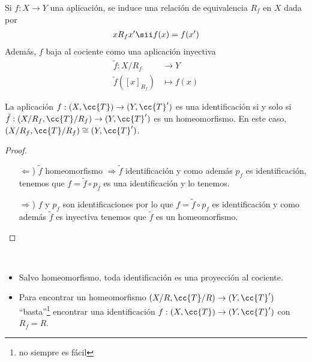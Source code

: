 \begin{definicion}
    Si $f:X\to Y$ una aplicación, se induce una relación de equivalencia $R_f$ en $X$ dada por 
    \begin{align*}
        xR_fx' \sii f(x)=f(x')
    \end{align*}
    Además, $f$ baja al cociente como una aplicación inyectiva
    \begin{align*}
        \tilde{f}: X/R_f &\to Y\\
        \tilde{f}([x]_{R_f}) & \mapsto f(x)
    \end{align*}
    \endsquare
\end{definicion}

\begin{prop}
    La aplicación $f:(X,\cc{T}) \to (Y, \cc{T}')$ es una identificación si y solo si $\tilde{f}:(X/R_f, \cc{T}/R_f)\to (Y, \cc{T}')$ es un homeomorfismo.
    En este caso, $(X/R_f, \cc{T}/R_f)\cong (Y, \cc{T}')$.
    \begin{proof}\
        \begin{itemize}
            \item[$\Leftarrow$)] $\tilde{f}$ homeomorfismo $\Rightarrow \tilde{f}$ identificación y como además $p_f$ es identificación, tenemos que $f=\tilde{f}\circ p_f$ es una identificación y lo tenemos.
            \item[$\Rightarrow$)] $f$ y $p_f$ son identificaciones por lo que $f=\tilde{f}\circ p_f$ es identificación y como además $\tilde{f}$ es inyectiva tenemos que $\tilde{f}$ es un homeomorfismo.
        \end{itemize}
    \end{proof}
\end{prop}

\begin{observacion}\
    \begin{itemize}
        \item Salvo homeomorfismo, toda identificación es una proyección al cociente.
        \item Para encontrar un homeomorfismo $(X/R, \cc{T}/R)\to (Y, \cc{T}')$ ``basta''\footnote{no siempre es fácil} encontrar una identificación $f:(X,\cc{T})\to (Y, \cc{T}')$ con $R_f=R$.
    \end{itemize}
    \endsquare
\end{observacion}

